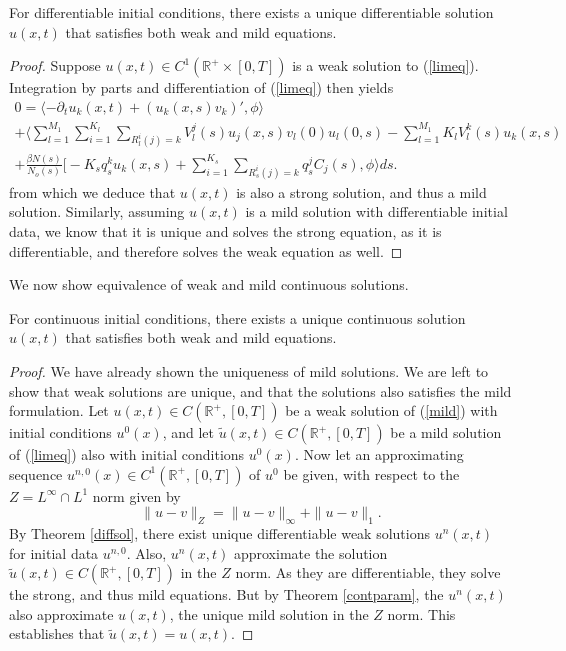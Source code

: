 \begin{theorem}\label{diffequiv} For differentiable initial conditions, there exists a unique differentiable solution $u(x,t)$ that satisfies both weak and mild equations.\end{theorem}
\begin{proof}
Suppose $u(x,t)\in C^1(\mathbb{R}^+\times [0,T])$ is a weak solution to (\ref{limeq}).  Integration by parts and differentiation of (\ref{limeq}) then yields
 \begin{align}
0 =  \langle- \partial_tu_k(x,t)+ (u_k(x,s)v_{k})', \phi \rangle\\ 
+\Big\langle\sum_{l = 1}^{M_1}\sum_{i = 1}^{K_l}\sum_{R_l^i(j) = k}V_l^j(s) u_j(x,s)v_l(0)u_l(0,s)
-\sum_{l = 1}^{M_1}K_lV_l^k(s)u_k(x,s)\nonumber\\  
+ \frac{\beta N(s)}{N_o(s)}\Big[-K_{s}q_s^k  u_k(x,s)+\sum_{i = 1}^{K_s}\sum_{R_s^{i}(j) = k} q_s^j  C_j(s), \phi \Big\rangle ds. \nonumber
\end{align} 
from which we deduce that $u(x,t)$ is also a strong solution, and thus a mild solution. Similarly, assuming $u(x,t)$ is a mild solution with differentiable initial data, we know that it is unique and solves the strong equation, as it is differentiable, and therefore solves the weak equation as well. 
  \end{proof}
 We now show equivalence of weak and mild continuous solutions.
\begin{theorem}
For continuous initial conditions, there exists a unique continuous solution $u(x,t)$ that satisfies both weak and mild equations.
\end{theorem}

\begin{proof}
We have already shown the uniqueness of mild solutions.  We are left to show that weak solutions are unique, and that the solutions also satisfies the mild formulation. Let $u(x,t)\in C(\mathbb{R}^+, [0,T])$ be a weak solution of (\ref{mild}) with initial conditions $u^0(x)$, and let $\tilde u(x,t)\in C(\mathbb{R}^+, [0,T])$ be a mild solution of (\ref{limeq}) also with initial conditions $u^0(x)$. Now let an approximating sequence $u^{n,0}(x) \in C^1(\mathbb{R}^+, [0,T])$ of $u^0$ be given, with respect to the $Z= L^\infty\cap L^1$ norm given by 
\begin{equation}
\|u-v\|_Z =  \|u-v\|_\infty +\|u-v\|_1.
\end{equation}
 By Theorem \ref{diffsol}, there exist unique differentiable weak solutions $u^n(x,t)$ for initial data $u^{n,0}$. Also, $u^n(x,t)$ approximate the solution $\tilde u(x,t)\in C(\mathbb{R}^+, [0,T])$ in the $Z$ norm.   As they are differentiable, they solve the strong, and thus mild equations.  But   by Theorem \ref{contparam}, the $u^n(x,t)$ also approximate $u(x,t)$, the unique mild solution in the $Z$ norm.  This establishes that $\tilde u(x,t) = u(x,t)$.
\end{proof}

